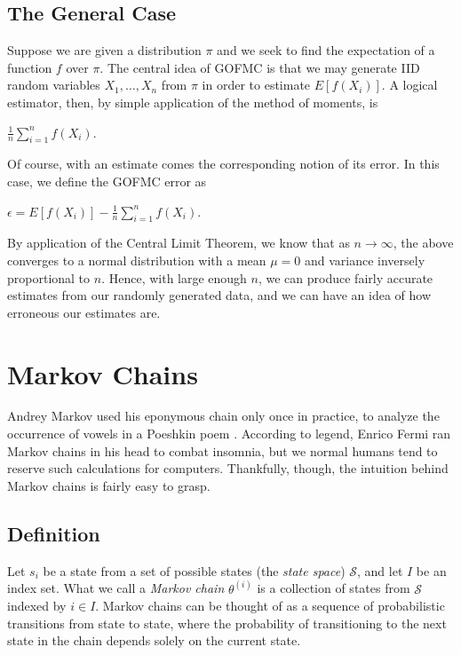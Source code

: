 \documentclass[12pt,twoside]{reedthesis}
\begin{document}
		\subsection*{The General Case}
			Suppose we are given a distribution $\pi$ and we seek to find the expectation of a function $f$ over $\pi$. The central idea of GOFMC is that we may generate IID random variables $X_1, \ldots, X_n$ from $\pi$ in order to estimate $E[f(X_i)]$. A logical estimator, then, by simple application of the method of moments, is 
			\begin{center}
				$\displaystyle\frac{1}{n}\displaystyle\sum_{i=1}^{n}{f(X_i)}$.
			\end{center}		
			Of course, with an estimate comes the corresponding notion of its error. 
			In this case, we define the GOFMC error as
			\begin{center}
				$\epsilon = E[f(X_i)] - \displaystyle\frac{1}{n}\displaystyle\sum_{i=1}^{n}f(X_i)$.
			\end{center}
			By application of the Central Limit Theorem, we know that as $n \rightarrow \infty$, the above converges to a normal distribution with a mean $\mu = 0$ and variance inversely proportional to $n$.
			Hence, with large enough $n$, we can produce fairly accurate estimates from our randomly generated data, and we can have an idea of how erroneous our estimates are. 
	\section{Markov Chains}
	Andrey Markov used his eponymous chain only once in practice, to analyze the occurrence of vowels in a Poeshkin poem \cite{hist}. According to legend, Enrico Fermi ran Markov chains in his head to combat insomnia, but we normal humans tend to reserve such calculations for computers. Thankfully, though, the intuition behind Markov chains is fairly easy to grasp.
	 
	 			\subsection*{Definition}
			Let $s_i$ be a state from a set of possible states (the {\em state space}) $\mathcal S$, and let $I$ be an index set. What we call a {\em Markov chain} $\theta^{(i)}$ is a collection of states from $\mathcal S$ indexed by $i \in I$. Markov chains can be thought of as a sequence of probabilistic transitions from state to state, where the probability of transitioning to the next state in the chain depends solely on the current state. 
			
\end{document}

